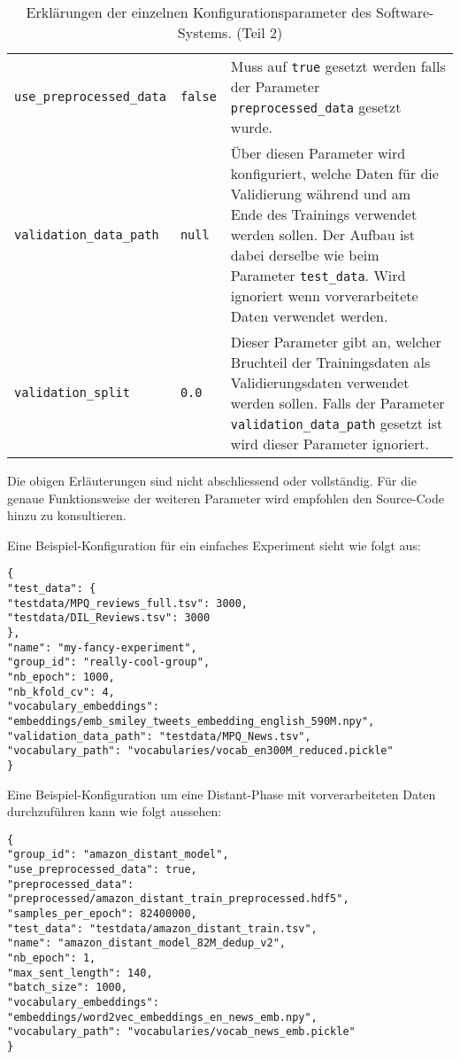 \begin{table}[H]
\begin{adjustbox}{max width=\textwidth, max height=\textheight}
\begin{tabular}{llp{10cm}}
			\texttt{use{\_}preprocessed{\_}data} & \texttt{false} & Muss auf \texttt{true} gesetzt werden falls der Parameter \texttt{preprocessed{\_}data} gesetzt wurde.\\
			\texttt{validation{\_}data{\_}path} & \texttt{null} & Über diesen Parameter wird konfiguriert, welche Daten für die Validierung während und am Ende des Trainings verwendet werden sollen. Der Aufbau ist dabei derselbe wie beim Parameter \texttt{test{\_}data}. Wird ignoriert wenn vorverarbeitete Daten verwendet werden.\\
			\texttt{validation{\_}split} & \texttt{0.0} & Dieser Parameter gibt an, welcher Bruchteil der Trainingsdaten als Validierungsdaten verwendet werden sollen. Falls der Parameter \texttt{validation{\_}data{\_}path} gesetzt ist wird dieser Parameter ignoriert.\\
			\bottomrule
		\end{tabular}
	\end{adjustbox}
	\caption{Erklärungen der einzelnen Konfigurationsparameter des Software-Systems. (Teil 2)}
\end{table}

Die obigen Erläuterungen sind nicht abschliessend oder vollständig. Für die genaue Funktionsweise der weiteren Parameter wird empfohlen den Source-Code hinzu zu konsultieren.

\clearpage

Eine Beispiel-Konfiguration für ein einfaches Experiment sieht wie folgt aus:

\begin{lstlisting}[frame=none]
{
"test_data": {
"testdata/MPQ_reviews_full.tsv": 3000,
"testdata/DIL_Reviews.tsv": 3000
},
"name": "my-fancy-experiment",
"group_id": "really-cool-group",
"nb_epoch": 1000,
"nb_kfold_cv": 4,
"vocabulary_embeddings": "embeddings/emb_smiley_tweets_embedding_english_590M.npy",
"validation_data_path": "testdata/MPQ_News.tsv",
"vocabulary_path": "vocabularies/vocab_en300M_reduced.pickle"
}
\end{lstlisting}

Eine Beispiel-Konfiguration um eine Distant-Phase mit vorverarbeiteten Daten durchzuführen kann wie folgt aussehen:

\begin{lstlisting}[frame=none]
{
"group_id": "amazon_distant_model",
"use_preprocessed_data": true,
"preprocessed_data": "preprocessed/amazon_distant_train_preprocessed.hdf5",
"samples_per_epoch": 82400000,
"test_data": "testdata/amazon_distant_train.tsv",
"name": "amazon_distant_model_82M_dedup_v2",
"nb_epoch": 1,
"max_sent_length": 140,
"batch_size": 1000,
"vocabulary_embeddings": "embeddings/word2vec_embeddings_en_news_emb.npy",
"vocabulary_path": "vocabularies/vocab_news_emb.pickle"
}
\end{lstlisting}

